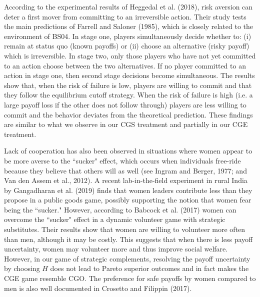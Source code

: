 \documentclass[12pt,english]{article}
\begin{document}
According to the experimental results of Heggedal et al. (2018), risk aversion can deter a first mover from committing to an irreversible action. Their study tests the main predictions of Farrell and Saloner (1985), which is closely related to the environment of BS04. In stage one, players simultaneously decide whether to: (i) remain at status quo (known payoffs) or (ii) choose an alternative (risky payoff) which is irreversible. In stage two, only those players who have not yet committed to an action choose between the two alternatives. If no player committed to an action in stage one, then second stage decisions become simultaneous. The results show that, when the risk of failure is low, players are willing to commit and that they follow the equilibrium cutoff strategy. When the risk of failure is high (i.e. a large payoff loss if the other does not follow through) players are less willing to commit and the behavior deviates from the theoretical prediction. These findings are similar to what we observe in our CGS treatment and partially in our CGE treatment.

Lack of cooperation has also been observed in situations where women appear to be more averse to the ``sucker" effect, which occurs when individuals free-ride because they believe that others will as well (see Ingram and Berger, 1977; and Van den Assem et al., 2012). A recent lab-in-the-field experiment in rural India by Gangadharan et al. (2019) finds that women leaders contribute less than they propose in a public goods game, possibly supporting the notion that women fear being the ``sucker." However, according to Babcock et al. (2017) women can overcome the ``sucker" effect in a dynamic volunteer game with strategic substitutes. Their results show that women are willing to volunteer more often than men, although it may be costly. This suggests that when there is less payoff uncertainty, women may volunteer more and thus improve social welfare. However, in our game of strategic complements, resolving the payoff uncertainty by choosing $H$ does not lead to Pareto superior outcomes and in fact makes the CGE game resemble CGO. The preference for safe payoffs by women compared to men is also well documented in Crosetto and Filippin (2017).
\end{document}
